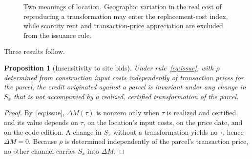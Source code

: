 \documentclass[11pt]{article}
\newtheorem{proposition}{Proposition}
\theoremstyle{definition}
\begin{document}
\begin{figure}[htbp]
\centering
{} 
\caption{Two meanings of location. Geographic variation in the real cost of reproducing a transformation may enter the replacement-cost index, while scarcity rent and transaction-price appreciation are excluded from the issuance rule.}
\label{fig:two-location-effects}
\end{figure}


Three results follow.

\begin{proposition}[Insensitivity to site bids]
Under rule~\eqref{eq:issue}, with $\rho$ determined from construction input costs independently of transaction prices for the parcel, the credit originated against a parcel is invariant under any change in $S_x$ that is not accompanied by a realized, certified transformation of the parcel.
\end{proposition}

\begin{proof}
By~\eqref{eq:issue}, $\Delta M(\tau)$ is nonzero only when $\tau$ is realized and certified, and its value depends on $\tau$, on the location's input costs, on the price date, and on the code edition. A change in $S_x$ without a transformation yields no $\tau$, hence $\Delta M=0$. Because $\rho$ is determined independently of the parcel's transaction price, no other channel carries $S_x$ into $\Delta M$.
\end{proof}
\end{document}

